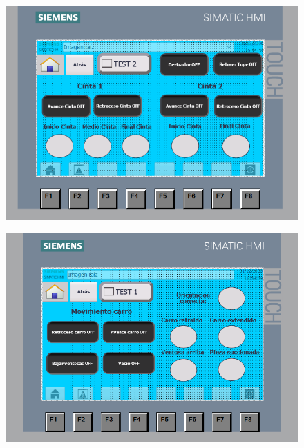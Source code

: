 \begin{figure}[H]
  \centering

  \begin{minipage}{0.95\textwidth}
    \centering
    \includegraphics[width=\textwidth]{figs/HMI_test_union_1}
    \label{fig:HMI_test_union_1}
  \end{minipage}
  \hfill
  \begin{minipage}{0.95\textwidth}
    \centering
    \includegraphics[width=\textwidth]{figs/HMI_test_union_2}
    \label{fig:HMI_test_union_2}
  \end{minipage}
\end{figure}


